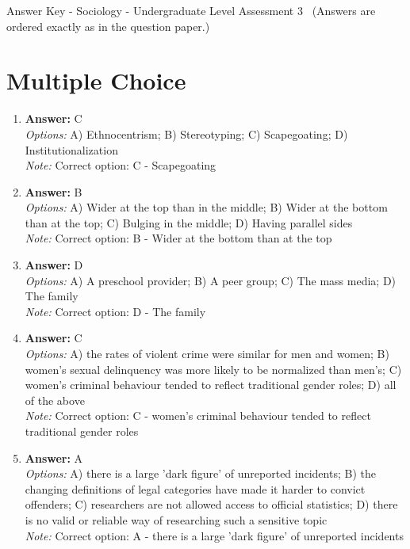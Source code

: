 \documentclass[12pt]{article}
\begin{document}
\begin{center}
Answer Key - Sociology - Undergraduate Level Assessment 3 \
\small (Answers are ordered exactly as in the question paper.)
\end{center}

\section*{Multiple Choice}
\begin{enumerate}[label=\arabic*.]
\item \textbf{Answer:} C
\\ \textit{Options:} A) Ethnocentrism; B) Stereotyping; C) Scapegoating; D) Institutionalization
\\ \textit{Note:} Correct option: C - Scapegoating
\item \textbf{Answer:} B
\\ \textit{Options:} A) Wider at the top than in the middle; B) Wider at the bottom than at the top; C) Bulging in the middle; D) Having parallel sides
\\ \textit{Note:} Correct option: B - Wider at the bottom than at the top
\item \textbf{Answer:} D
\\ \textit{Options:} A) A preschool provider; B) A peer group; C) The mass media; D) The family
\\ \textit{Note:} Correct option: D - The family
\item \textbf{Answer:} C
\\ \textit{Options:} A) the rates of violent crime were similar for men and women; B) women's sexual delinquency was more likely to be normalized than men's; C) women's criminal behaviour tended to reflect traditional gender roles; D) all of the above
\\ \textit{Note:} Correct option: C - women's criminal behaviour tended to reflect traditional gender roles
\item \textbf{Answer:} A
\\ \textit{Options:} A) there is a large 'dark figure' of unreported incidents; B) the changing definitions of legal categories have made it harder to convict offenders; C) researchers are not allowed access to official statistics; D) there is no valid or reliable way of researching such a sensitive topic
\\ \textit{Note:} Correct option: A - there is a large 'dark figure' of unreported incidents
\end{enumerate}
\end{document}
